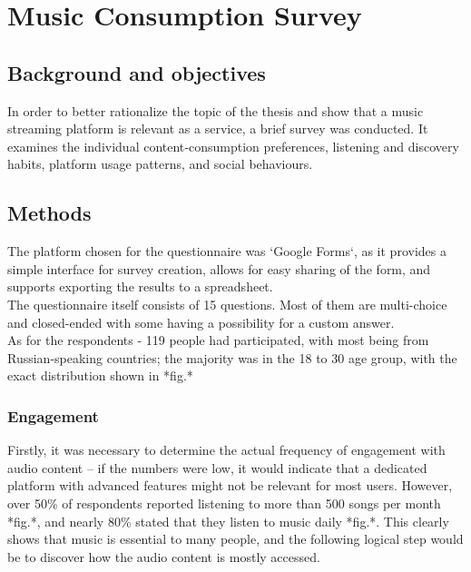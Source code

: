\chapter{Music Consumption Survey}\label{chap:survey}


\section{Background and objectives}
In order to better rationalize the topic of the thesis and show that a music streaming platform
is relevant as a service, a brief survey was conducted. It examines the
individual content‐consumption preferences, listening and discovery habits, platform usage patterns, and
social behaviours.


\section{Methods}
The platform chosen for the questionnaire was `Google Forms`\cite{googleforms}, as it provides a simple interface for
survey creation, allows for easy sharing of the form, and supports exporting the results to a spreadsheet.\\

The questionnaire itself consists of 15 questions.
Most of them are multi-choice and closed-ended with some having a possibility for a custom answer.\\

As for the respondents - 119 people had participated, with most being from Russian-speaking countries;
the majority was in the 18 to 30 age group, with the exact distribution shown in *fig.*

\subsection{Engagement}
Firstly, it was necessary to determine the actual frequency of engagement with audio content -- if the numbers were low,
it would indicate that a dedicated platform with advanced features might not be relevant for most users.
However, over 50\% of respondents reported listening to more than 500 songs per month *fig.*,
and nearly 80\% stated that they listen to music daily *fig.*.
This clearly shows that music is essential to many people, and the following logical step would be to discover
how the audio content is mostly accessed. \\

